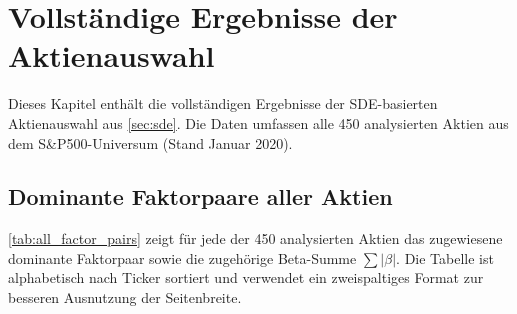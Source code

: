 \chapter{Vollständige Ergebnisse der Aktienauswahl}\label{app:selection_results}

Dieses Kapitel enthält die vollständigen Ergebnisse der SDE-basierten Aktienauswahl aus \cref{sec:sde}. Die Daten umfassen alle 450 analysierten Aktien aus dem S\&P500-Universum (Stand Januar 2020).

\section{Dominante Faktorpaare aller Aktien}

\cref{tab:all_factor_pairs} zeigt für jede der 450 analysierten Aktien das zugewiesene dominante Faktorpaar sowie die zugehörige Beta-Summe $\sum|\beta|$. Die Tabelle ist alphabetisch nach Ticker sortiert und verwendet ein zweispaltiges Format zur besseren Ausnutzung der Seitenbreite.

